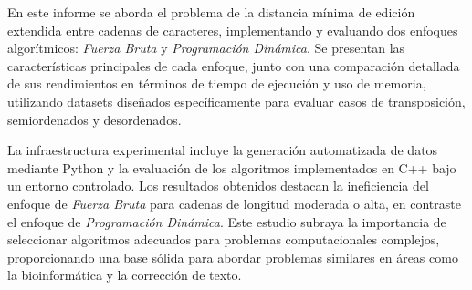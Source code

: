 En este informe se aborda el problema de la distancia mínima de edición extendida entre cadenas de caracteres, implementando y evaluando dos enfoques algorítmicos: \textit{Fuerza Bruta} y \textit{Programación Dinámica}. Se presentan las características principales de cada enfoque, junto con una comparación detallada de sus rendimientos en términos de tiempo de ejecución y uso de memoria, utilizando datasets diseñados específicamente para evaluar casos de transposición, semiordenados y desordenados.

La infraestructura experimental incluye la generación automatizada de datos mediante Python y la evaluación de los algoritmos implementados en C++ bajo un entorno controlado. Los resultados obtenidos destacan la ineficiencia del enfoque de \textit{Fuerza Bruta} para cadenas de longitud moderada o alta, en contraste el enfoque de \textit{Programación Dinámica}.
Este estudio subraya la importancia de seleccionar algoritmos adecuados para problemas computacionales complejos, proporcionando una base sólida para abordar problemas similares en áreas como la bioinformática y la corrección de texto.